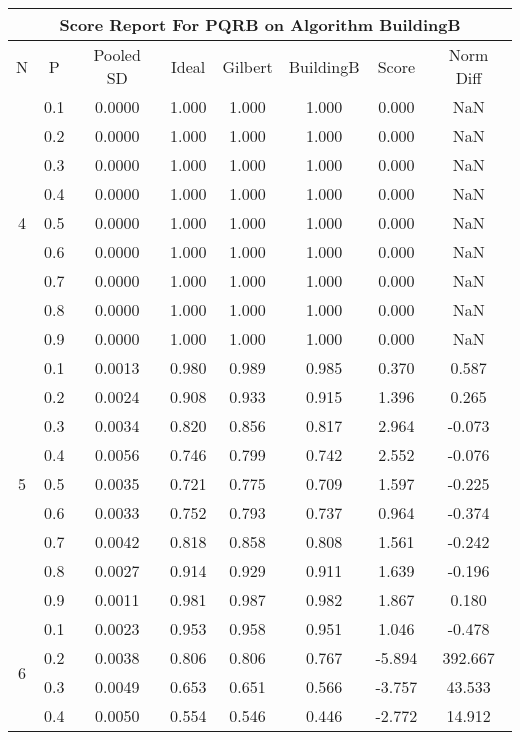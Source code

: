 \documentclass[11pt,a4paper]{report}
\begin{document}
\begin{longtable}{ | c | c || c | c | c | c | c | c | }
\hline
\multicolumn{8}{|c|}{ Score Report For PQRB on Algorithm BuildingB} \\
\hline
N & P & Pooled SD &  Ideal &  Gilbert & BuildingB  & Score & Norm Diff \\
 \hline
 \hline
 \endhead
\multirow{9}{*}{4} & 0.1 & 0.0000 & 1.000 & 1.000 & 1.000 & 0.000 & NaN \\
 & 0.2 & 0.0000 & 1.000 & 1.000 & 1.000 & 0.000 & NaN \\
 & 0.3 & 0.0000 & 1.000 & 1.000 & 1.000 & 0.000 & NaN \\
 & 0.4 & 0.0000 & 1.000 & 1.000 & 1.000 & 0.000 & NaN \\
 & 0.5 & 0.0000 & 1.000 & 1.000 & 1.000 & 0.000 & NaN \\
 & 0.6 & 0.0000 & 1.000 & 1.000 & 1.000 & 0.000 & NaN \\
 & 0.7 & 0.0000 & 1.000 & 1.000 & 1.000 & 0.000 & NaN \\
 & 0.8 & 0.0000 & 1.000 & 1.000 & 1.000 & 0.000 & NaN \\
 & 0.9 & 0.0000 & 1.000 & 1.000 & 1.000 & 0.000 & NaN \\
 \hline
\multirow{9}{*}{5} & 0.1 & 0.0013 & 0.980 & 0.989 & 0.985 & 0.370 & 0.587 \\
 & 0.2 & 0.0024 & 0.908 & 0.933 & 0.915 & 1.396 & 0.265 \\
 & 0.3 & 0.0034 & 0.820 & 0.856 & 0.817 & 2.964 & -0.073 \\
 & 0.4 & 0.0056 & 0.746 & 0.799 & 0.742 & 2.552 & -0.076 \\
 & 0.5 & 0.0035 & 0.721 & 0.775 & 0.709 & 1.597 & -0.225 \\
 & 0.6 & 0.0033 & 0.752 & 0.793 & 0.737 & 0.964 & -0.374 \\
 & 0.7 & 0.0042 & 0.818 & 0.858 & 0.808 & 1.561 & -0.242 \\
 & 0.8 & 0.0027 & 0.914 & 0.929 & 0.911 & 1.639 & -0.196 \\
 & 0.9 & 0.0011 & 0.981 & 0.987 & 0.982 & 1.867 & 0.180 \\
 \hline
\multirow{9}{*}{6} & 0.1 & 0.0023 & 0.953 & 0.958 & 0.951 & 1.046 & -0.478 \\
 & 0.2 & 0.0038 & 0.806 & 0.806 & 0.767 & -5.894 & 392.667 \\
 & 0.3 & 0.0049 & 0.653 & 0.651 & 0.566 & -3.757 & 43.533 \\
 & 0.4 & 0.0050 & 0.554 & 0.546 & 0.446 & -2.772 & 14.912 \\

\end{longtable}
\end{document}
